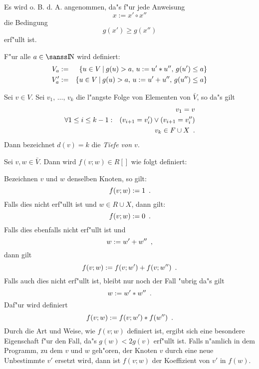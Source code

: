 Es wird o. B. d. A. angenommen, da"s f"ur jede Anweisung 
\[ x := x' \circ x'' \] die Bedingung \[ g(x') \geq g(x'') \]
erf"ullt ist.

F"ur alle $a \in \Nat$ wird definiert:
\begin{eqnarray*}
   V_a & := & \{ u \in V \: | \:
                 g(u) > a, \, u:= u' * u'', \, g(u') \leq a \}  \\
   V_a'& := & \{ u \in V \: | \:
                 g(u) > a, \, u:= u' + u'', \, g(u'') \leq a \}
\end{eqnarray*}

\MyBeginDef
\label{DefTiefe}
    Sei $v\in V$. Sei $v_1, \, \ldots , \, v_k$ die l"angste Folge von 
    Elementen von $\bar{V}$, so da"s gilt
    \begin{eqnarray*}
        & & v_1 = v \\
        \forall 1 \leq i \leq k-1 & : & (v_{i+1} = v_i') \vee 
                                        (v_{i+1} = v_i'') \\
        & & v_k \in F \cup X
        \mbox{\hspace{0.5em}.}
    \end{eqnarray*}
    Dann bezeichnet $d(v)=k$ die {\em Tiefe von $v$}.
\MyEndDef

\MyBeginDef
\label{Deffvw}
    Sei $v,w \in \bar{V}$.
    Dann wird $f(v;w) \in R[]$ wie folgt definiert:

    Bezeichnen $v$ und $w$ denselben Knoten, so gilt:
    \[ f(v;w) := 1 \mbox{\hspace{0.5em}.} \]
    Falls dies nicht erf"ullt ist und $w \in R \cup X$, dann gilt:
    \[ f(v;w) := 0 \mbox{\hspace{0.5em}.} \]
    Falls dies ebenfalls nicht erf"ullt ist und
    \[ w:= w' + w'' \mbox{\hspace{0.5em},} \]
    dann gilt \[ f(v;w) := f(v;w') + f(v;w'') \mbox{\hspace{0.5em}.} \]
    Falls auch dies nicht erf"ullt ist, bleibt nur noch der Fall "ubrig
    da"s gilt
    \[ w:= w' * w'' \mbox{\hspace{0.5em}.} \] Daf"ur wird definiert
    \[ f(v;w) := f(v;w') * f(w'') \mbox{\hspace{0.5em}.} \]
\MyEndDef
Durch die Art und Weise, wie $f(v;w)$ definiert ist, ergibt sich eine
besondere Eigenschaft f"ur den Fall, da"s $g(w) < 2g(v)$ erf"ullt ist.
Falls n"amlich in dem Programm, zu dem $v$ und $w$ geh"oren,
der Knoten $v$ durch eine neue 
Unbestimmte $v'$ ersetzt wird, dann ist $f(v;w)$ der Koeffizient von 
$v'$ in $f(w)$. 

